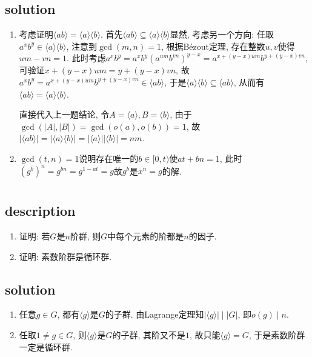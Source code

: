 \documentclass[UTF-8]{ctexart}
\begin{document}
\subsection{solution}
\begin{enumerate}
	\item 考虑证明$\langle ab \rangle = \langle a \rangle \langle b \rangle$. 首先$\langle ab \rangle \subseteq \langle a \rangle \langle b \rangle$显然, 考虑另一个方向: 任取$a^xb^y \in \langle a \rangle \langle b \rangle$, 注意到$\gcd(m, n) = 1$, 根据B\'ezout定理, 存在整数$u, v$使得$um - vn = 1$. 此时考虑$a^xb^y = a^xb^y(a^{um}b^{vn})^{y-x} = a^{x + (y - x)um}b^{y + (y - x)vn}$, 可验证$x + (y - x)um = y + (y - x)vn$, 故$a^xb^y = a^{x + (y - x)um}b^{y + (y - x)vn} \in \langle ab \rangle$, 于是$\langle a \rangle \langle b \rangle \subseteq \langle ab \rangle$, 从而有$\langle ab \rangle = \langle a \rangle \langle b \rangle$.
	
	直接代入上一题结论, 令$A = \langle a \rangle, B = \langle b \rangle$, 由于$\gcd(|A|, |B|) = \gcd(o(a), o(b)) = 1$, 故$|\langle ab \rangle| = |\langle a \rangle \langle b \rangle| = |\langle a \rangle| |\langle b \rangle| = nm$.
	\item $\gcd(t, n) = 1$说明存在唯一的$b \in [0, t)$使$at + bn = 1$, 此时$(g^b)^n = g^{bn} = g^{1 - at} = g$故$g^b$是$x^n = g$的解.
\end{enumerate}

\section{}
\subsection{description}
\begin{enumerate}
	\item 证明: 若$G$是$n$阶群, 则$G$中每个元素的阶都是$n$的因子.
	\item 证明: 素数阶群是循环群.
\end{enumerate}
\subsection{solution}
\begin{enumerate}
	\item 任意$g \in G$, 都有$\langle g \rangle$是$G$的子群. 由Lagrange定理知$|\langle g \rangle| \mid |G|$, 即$o(g) \mid n$.
	\item 任取$1 \neq g \in G$, 则$\langle g \rangle$是$G$的子群, 其阶又不是$1$, 故只能$\langle g \rangle = G$, 于是素数阶群一定是循环群.
\end{enumerate}
\end{document}
